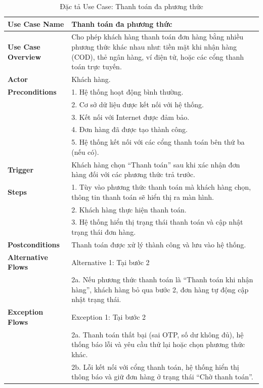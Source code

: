 {\begin{longtable}{|>{\bfseries}p{4cm}|p{11.5cm}|}
\caption{Đặc tả Use Case: Thanh toán đa phương thức}
\label{tab:uc-multipayment} \\
\hline
\textbf{Use Case Name} & Thanh toán đa phương thức \\
\hline
\textbf{Use Case Overview} & Cho phép khách hàng thanh toán đơn hàng bằng nhiều phương thức khác nhau như: tiền mặt khi nhận hàng (COD), thẻ ngân hàng, ví điện tử, hoặc các cổng thanh toán trực tuyến. \\
\hline
\textbf{Actor} & Khách hàng. \\
\hline
\textbf{Preconditions} & 1. Hệ thống hoạt động bình thường. \\
& 2. Cơ sở dữ liệu được kết nối với hệ thống. \\
& 3. Kết nối với Internet được đảm bảo. \\
& 4. Đơn hàng đã được tạo thành công. \\
& 5. Hệ thống kết nối với các cổng thanh toán bên thứ ba (nếu có). \\
\hline
\textbf{Trigger} & Khách hàng chọn “Thanh toán” sau khi xác nhận đơn hàng đối với các phương thức trả trước. \\
\hline
\textbf{Steps} & 1. Tùy vào phương thức thanh toán mà khách hàng chọn, thông tin thanh toán sẽ hiển thị ra màn hình. \\
& 2. Khách hàng thực hiện thanh toán. \\
& 3. Hệ thống hiển thị trạng thái thanh toán và cập nhật trạng thái đơn hàng. \\
\hline
\textbf{Postconditions} & Thanh toán được xử lý thành công và lưu vào hệ thống. \\
\hline
\textbf{Alternative Flows} & Alternative 1: Tại bước 2 \\
& 2a. Nếu phương thức thanh toán là “Thanh toán khi nhận hàng”, khách hàng bỏ qua bước 2, đơn hàng tự động cập nhật trạng thái. \\
\hline
\textbf{Exception Flows} & Exception 1: Tại bước 2 \\
& 2a. Thanh toán thất bại (sai OTP, số dư không đủ), hệ thống báo lỗi và yêu cầu thử lại hoặc chọn phương thức khác. \\
& 2b. Lỗi kết nối với cổng thanh toán, hệ thống hiển thị thông báo và giữ đơn hàng ở trạng thái “Chờ thanh toán”. \\
\hline
\end{longtable}

}

